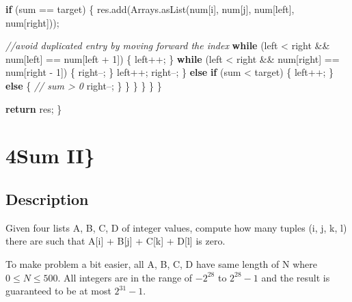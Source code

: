 \documentclass[]{book}
\newenvironment{Shaded}{\begin{snugshade}}{\end{snugshade}}
\newcommand{\BuiltInTok}[1]{#1}
\newcommand{\CommentTok}[1]{\textcolor[rgb]{0.56,0.35,0.01}{\textit{#1}}}
\newcommand{\DecValTok}[1]{\textcolor[rgb]{0.00,0.00,0.81}{#1}}
\newcommand{\FunctionTok}[1]{\textcolor[rgb]{0.00,0.00,0.00}{#1}}
\newcommand{\KeywordTok}[1]{\textcolor[rgb]{0.13,0.29,0.53}{\textbf{#1}}}
\newcommand{\NormalTok}[1]{#1}
\begin{document}
\begin{Shaded}
\begin{Highlighting}[]
                        \KeywordTok{if}\NormalTok{ (sum == target) \{}
\NormalTok{                            res.}\FunctionTok{add}\NormalTok{(}\BuiltInTok{Arrays}\NormalTok{.}\FunctionTok{asList}\NormalTok{(num[i], num[j], num[left], num[right]));}

                            \CommentTok{//avoid duplicated entry by moving forward the index}
                            \KeywordTok{while}\NormalTok{ (left < right && num[left] == num[left + }\DecValTok{1}\NormalTok{]) \{}
\NormalTok{                                left++;}
\NormalTok{                            \}}
                            \KeywordTok{while}\NormalTok{ (left < right && num[right] == num[right - }\DecValTok{1}\NormalTok{]) \{}
\NormalTok{                                right--;}
\NormalTok{                            \}}
\NormalTok{                            left++;}
\NormalTok{                            right--;}
\NormalTok{                        \} }\KeywordTok{else} \KeywordTok{if}\NormalTok{ (sum < target) \{}
\NormalTok{                            left++;}
\NormalTok{                        \} }\KeywordTok{else}\NormalTok{ \{}
                            \CommentTok{// sum > 0}
\NormalTok{                            right--;}
\NormalTok{                        \}}
\NormalTok{                    \}}
\NormalTok{                \}}
\NormalTok{            \}}
\NormalTok{        \}}
\NormalTok{    \}}

    \KeywordTok{return}\NormalTok{ res;}
\NormalTok{\}}
\end{Highlighting}
\end{Shaded}

\hypertarget{sum-ii}{%
\section{4Sum II\}}\label{sum-ii}}

\hypertarget{description-7}{%
\subsection{Description}\label{description-7}}

Given four lists A, B, C, D of integer values, compute how many tuples (i, j, k, l) there are such that
A{[}i{]} + B{[}j{]} + C{[}k{]} + D{[}l{]} is zero.

To make problem a bit easier, all A, B, C, D have same length of N where \(0 \le N \le 500\). All integers are
in the range of \(-2^{28}\) to \(2^{28} - 1\) and the result is guaranteed to be at most \(2^{31} - 1\).
\end{document}
